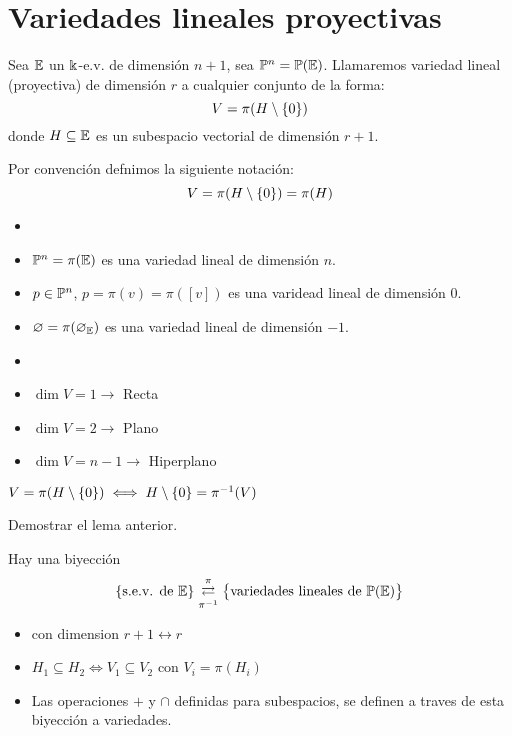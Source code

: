 \section{Variedades lineales proyectivas}

\begin{defi}
    Sea $\mathbb{E}$ un $\Bbbk$-e.v. de dimensión $n+1$, sea $\mathbb{P}^n = \mathbb{P}(\mathbb{E})$.
    Llamaremos variedad lineal (proyectiva) de dimensión $r$ a cualquier conjunto
    de la forma:
    \[V = \pi(H \setminus \left\{0\right\})\]
    donde $H \subseteq \mathbb{E}$ es un subespacio vectorial de dimensión $r+1$.

    Por convención defnimos la siguiente notación:
    \[V = \pi(H \setminus \left\{0\right\}) = \pi(H)\]
\end{defi}
\begin{example}
    \begin{itemize}
        \item []
        \item $\mathbb{P}^n = \pi(\mathbb{E})$ es una variedad lineal de dimensión $n$.
        \item $p \in \mathbb{P}^n$, $p = \pi(v) = \pi([v])$ es una varidead lineal de dimensión $0$.
        \item $\varnothing = \pi({\varnothing_{\mathbb{E}}})$ es una variedad lineal de dimensión $-1$.
    \end{itemize}
\end{example}
\begin{defi}
    \begin{itemize}
        \item []
        \item $\dim V = 1 \longrightarrow$ Recta
        \item $\dim V = 2 \longrightarrow$ Plano
        \item $\dim V = n-1 \longrightarrow$ Hiperplano
    \end{itemize}
\end{defi}
\begin{lema}
    $V = \pi(H\setminus\left\{0\right\}) \iff H \setminus \left\{0\right\} = \pi^{-1}(V)$
\end{lema}
\begin{ej}
    Demostrar el lema anterior.
\end{ej}
\begin{obs}
    Hay una biyección
    \[\left\{\text{s.e.v. de } \mathbb{E}\right\}
    \mathrel{\mathop{\rightleftarrows}^{\mathrm{\pi}}_{\mathrm{\pi^{-1}}}}
    \left\{\text{variedades lineales de } \mathbb{P}(\mathbb{E})\right\}\]
    \begin{itemize}
        \item con dimension $r+1 \leftrightarrow r$
        \item $H_1 \subseteq H_2 \iff V_1 \subseteq V_2$ con $V_i=\pi(H_i)$
        \item Las operaciones $+$ y $\cap$ definidas para subespacios, se definen
        a traves de esta biyección a variedades.
    \end{itemize}
\end{obs}
